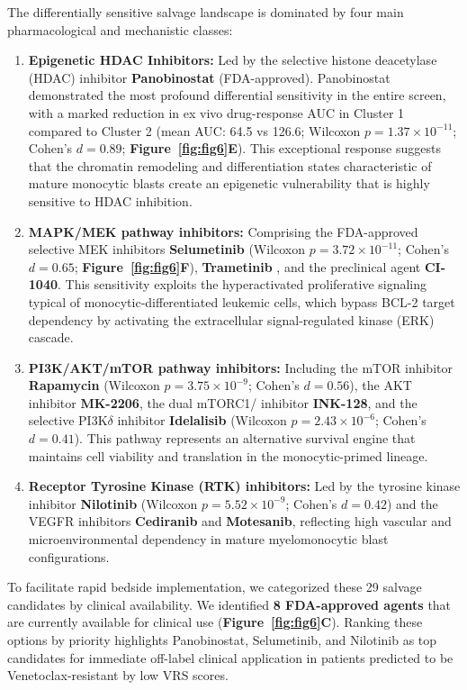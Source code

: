 \documentclass[11pt,a4paper]{article}
\begin{document}
The differentially sensitive salvage landscape is dominated by four main pharmacological and mechanistic classes:
\begin{enumerate}
\item \textbf{Epigenetic HDAC Inhibitors:} Led by the selective histone deacetylase (HDAC) inhibitor \textbf{Panobinostat} (FDA-approved). Panobinostat demonstrated the most profound differential sensitivity in the entire screen, with a marked reduction in ex vivo drug-response AUC in Cluster 1 compared to Cluster 2 (mean AUC: 64.5 vs 126.6; Wilcoxon $p = 1.37 \times 10^{-11}$; Cohen's $d = 0.89$; \textbf{Figure~\ref{fig:fig6}E}). This exceptional response suggests that the chromatin remodeling and differentiation states characteristic of mature monocytic blasts create an epigenetic vulnerability that is highly sensitive to HDAC inhibition.
\item \textbf{MAPK\slash\allowbreak MEK pathway inhibitors:} Comprising the FDA-approved selective MEK inhibitors \textbf{Selumetinib} (Wilcoxon $p = 3.72 \times 10^{-11}$; Cohen's $d = 0.65$; \textbf{Figure~\ref{fig:fig6}F}), \textbf{Trametinib} \cite{borthakur2016mek}, and the preclinical agent \textbf{CI-1040}. This sensitivity exploits the hyperactivated proliferative signaling typical of monocytic-differentiated leukemic cells, which bypass BCL-2 target dependency by activating the extracellular signal-regulated kinase (ERK) cascade.
\item \textbf{PI3K\slash\allowbreak AKT\slash\allowbreak mTOR pathway inhibitors:} Including the mTOR inhibitor \textbf{Rapamycin} (Wilcoxon $p = 3.75 \times 10^{-9}$; Cohen's $d = 0.56$), the AKT inhibitor \textbf{MK-2206}, the dual mTORC1\slash{} inhibitor \textbf{INK-128}, and the selective PI3K$\delta$ inhibitor \textbf{Idelalisib} (Wilcoxon $p = 2.43 \times 10^{-6}$; Cohen's $d = 0.41$). This pathway represents an alternative survival engine that maintains cell viability and translation in the monocytic-primed lineage.
\item \textbf{Receptor Tyrosine Kinase (RTK) inhibitors:} Led by the tyrosine kinase inhibitor \textbf{Nilotinib} (Wilcoxon $p = 5.52 \times 10^{-9}$; Cohen's $d = 0.42$) and the VEGFR inhibitors \textbf{Cediranib} and \textbf{Motesanib}, reflecting high vascular and microenvironmental dependency in mature myelomonocytic blast configurations.
\end{enumerate}

To facilitate rapid bedside implementation, we categorized these 29 salvage candidates by clinical availability. We identified \textbf{8 FDA-approved agents} that are currently available for clinical use (\textbf{Figure~\ref{fig:fig6}C}). Ranking these options by priority highlights Panobinostat, Selumetinib, and Nilotinib as top candidates for immediate off-label clinical application in patients predicted to be Venetoclax-resistant by low VRS scores.
\end{document}
